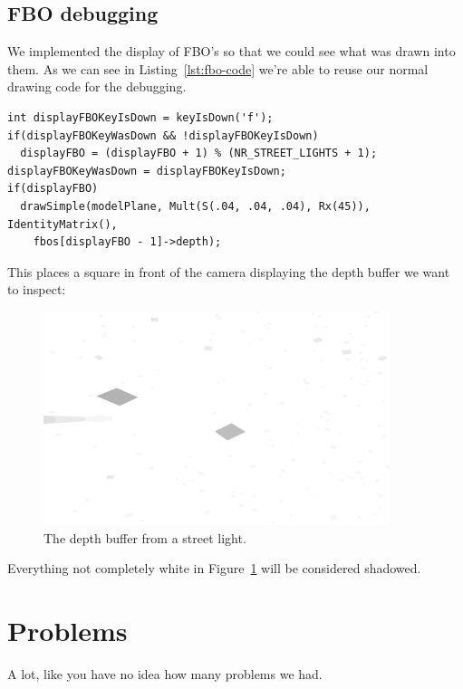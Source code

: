 \documentclass[a4paper,12pt]{article}
\begin{document}
\subsection{FBO debugging}

We implemented the display of FBO's so that we could see what was drawn into them. As we can see in Listing~\ref{lst:fbo-code} we're able to reuse our normal drawing code for the debugging.

\begin{lstlisting}[label=lst:fbo-code,caption= Switching between the FBO's]
int displayFBOKeyIsDown = keyIsDown('f');
if(displayFBOKeyWasDown && !displayFBOKeyIsDown)
  displayFBO = (displayFBO + 1) % (NR_STREET_LIGHTS + 1);
displayFBOKeyWasDown = displayFBOKeyIsDown;
if(displayFBO)
  drawSimple(modelPlane, Mult(S(.04, .04, .04), Rx(45)), IdentityMatrix(),
    fbos[displayFBO - 1]->depth);
\end{lstlisting}

This places a square in front of the camera displaying the depth buffer we want to inspect:

\begin{figure}[ht]
  \centering
  \includegraphics[width=0.9\textwidth]{fbo}
  \caption{\label{fig:fbo-image} The depth buffer from a street light.}
\end{figure}

Everything not completely white in Figure~\ref{fig:fbo-image} will be considered shadowed.



\section{Problems}

A lot, like you have no idea how many problems we had.
\end{document}
